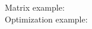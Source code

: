 \documentclass{article}
\begin{document}
Matrix example:\\


Optimization example:\\

\end{document}

